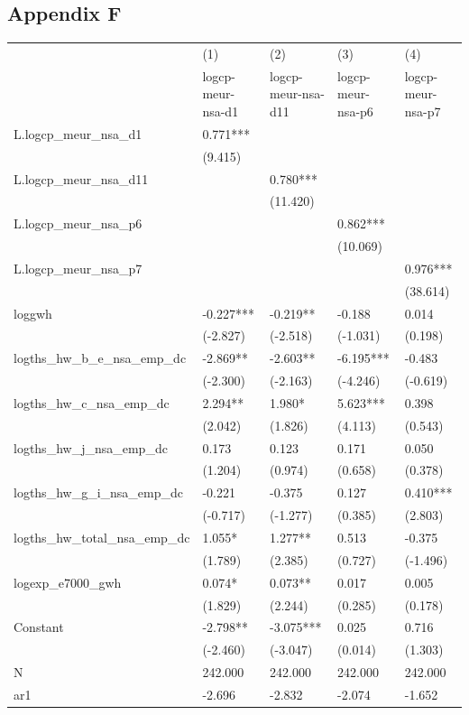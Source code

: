 \documentclass[12pt]{article}
\begin{document}
\subsection{Appendix F}
\begin{tabular}{ p{5.2cm} p{2cm} p{2cm} p{2cm} p{2cm} }
  \hline
   &(1)&(2)&(3)&(4)\\
   &\footnotesize{logcp-meur-nsa-d1}&\footnotesize{logcp-meur-nsa-d11}&\footnotesize{logcp-meur-nsa-p6}&\footnotesize{logcp-meur-nsa-p7}\\
 \hline
L.logcp\_meur\_nsa\_d1&0.771***& & & \\	
 &(9.415)& & & \\		
L.logcp\_meur\_nsa\_d11& &0.780***& & \\	
 & &(11.420)& & \\	
L.logcp\_meur\_nsa\_p6& & &0.862***& \\
 & & &(10.069)& \\
L.logcp\_meur\_nsa\_p7& & & &0.976***\\
 & & & &(38.614)\\
loggwh&-0.227***&-0.219**&-0.188&0.014\\
 &(-2.827)&(-2.518)&(-1.031)&(0.198)\\
logths\_hw\_b\_e\_nsa\_emp\_dc&-2.869**&-2.603**&-6.195***&-0.483\\
 &(-2.300)&(-2.163)&(-4.246)&(-0.619)\\
logths\_hw\_c\_nsa\_emp\_dc&2.294**&1.980*&5.623***&0.398\\
 &(2.042)&(1.826)&(4.113)&(0.543)\\
logths\_hw\_j\_nsa\_emp\_dc&0.173&0.123&0.171&0.050\\
 &(1.204)&(0.974)&(0.658)&(0.378)\\
logths\_hw\_g\_i\_nsa\_emp\_dc&-0.221&-0.375&0.127&0.410***\\
 &(-0.717)&(-1.277)&(0.385)&(2.803)\\
logths\_hw\_total\_nsa\_emp\_dc&1.055*&1.277**&0.513&-0.375\\
 &(1.789)&(2.385)&(0.727)&(-1.496)\\
logexp\_e7000\_gwh&0.074*&0.073**&0.017&0.005\\
 &(1.829)&(2.244)&(0.285)&(0.178)\\
Constant&-2.798**&-3.075***&0.025&0.716\\
 &(-2.460)&(-3.047)&(0.014)&(1.303)\\
 \hline
N&242.000&242.000&242.000&242.000\\
ar1&-2.696&-2.832&-2.074&-1.652\\

\end{tabular}
\end{document}

